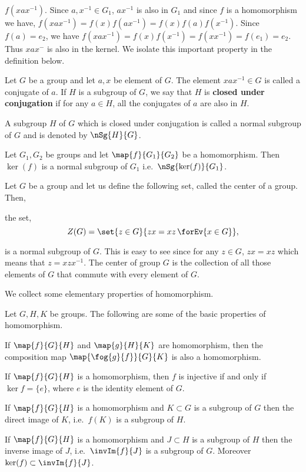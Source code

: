 $f(xax^{-1})$. Since $a,x^{-1} \in G_1$, $ax^{-1}$ is also in $G_1$ and since $f$ is a homomorphism we have,
$f(xax^{-1}) = f(x)f(ax^{-1}) = f(x)f(a)f(x^{-1})$. Since $f(a) = e_2$, we have $f(xax^{-1}) = f(x)f(x^{-1}) =
f(xx^{-1}) = f(e_1) = e_2$. Thus $xax^{-}$ is also in the kernel. We isolate this important property in the
definition below.
\begin{Definition}[name=conjugate]
    Let $G$ be a group and let $a,x$ be element of $G$. The element $xax^{-1} \in G$ is called a conjugate of
    $a$. If $H$ is a subgroup of $G$, we say that $H$ is \textbf{closed under conjugation} if for any $a \in
    H$, all the conjugates of $a$ are also in $H$.
\end{Definition}
\begin{Definition}
    A subgroup $H$ of $G$ which is closed under conjugation is called a normal subgroup of $G$ and is denoted
    by $\nSg{H}{G}$.
\end{Definition}
\begin{Example}
    Let $G_1,G_2$ be groups and let $\map{f}{G_1}{G_2}$ be a homomorphism. Then $\ker(f)$ is a normal subgroup
    of $G_1$ i.e.~$\nSg{\ker(f)}{G_1}$.
\end{Example}
\begin{Example}
    Let $G$ be a group and let us define the following set, called the center of a group. Then,
    \begin{Definition}
	the set,
	\[Z(G) = \set{z\in G}{zx = xz\,\forEv{x\in G}},\]
    \end{Definition}
    is a normal subgroup of $G$. This is easy to see since for any $z \in G$, $zx = xz$ which means that $z =
    xzx^{-1}$. The center of group $G$ is the collection of all those elements of $G$ that commute with every
    element of $G$.
\end{Example}
We collect some elementary properties of homomorphism.
\begin{Proposition}\label{prop:prop_hom}
    Let $G,H,K$ be groups. The following are some of the basic properties of homomorphism.
    \begin{properties}
    \item
	If $\map{f}{G}{H}$ and $\map{g}{H}{K}$ are homomorphism, then the composition map
	$\map{\fog{g}{f}}{G}{K}$ is also a homomorphism.
    \item
	If $\map{f}{G}{H}$ is a homomorphism, then $f$ is injective if and only if $\ker{f} = \lbrace e
	\rbrace$, where $e$ is the identity element of $G$.
    \item
	If $\map{f}{G}{H}$ is a homomorphism and $K \subset G$ is a subgroup of $G$ then the direct image of
	$K$, i.e.~$f(K)$ is a subgroup of $H$.
    \item
	If $\map{f}{G}{H}$ is a homomorphism and $J \subset H$ is a subgroup of $H$ then the inverse image of
	$J$, i.e.~$\invIm{f}{J}$ is a subgroup of $G$. Moreover $\ker(f) \subset \invIm{f}{J}$.
    \end{properties}
\end{Proposition}

